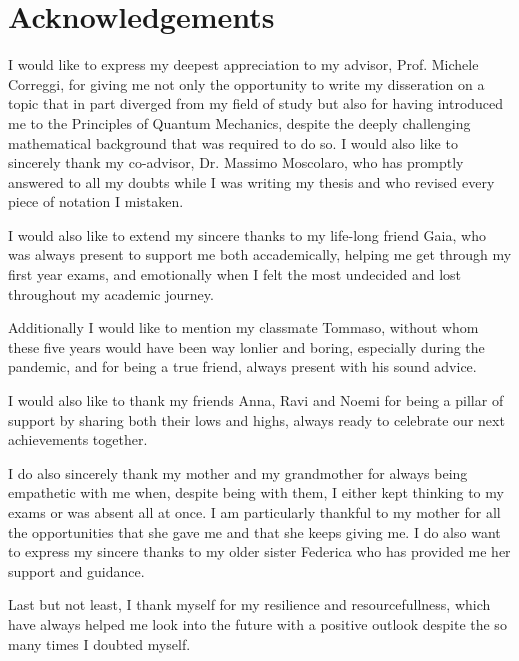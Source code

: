 \documentclass{Configuration_Files/PoliMi3i_thesis}
\begin{document}
\listoffigures



\chapter*{Acknowledgements}
I would like to express my deepest appreciation to my advisor, Prof. 
Michele Correggi, for giving me not only the opportunity to write my disseration 
on a topic that in part diverged from my field of study but also for having
introduced me to the Principles of Quantum Mechanics, despite the deeply
challenging mathematical background that was required to do so. 
I would also like to sincerely thank my co-advisor, Dr. Massimo Moscolaro, who
has promptly answered to all my doubts while I was writing my thesis and who
revised every piece of notation I mistaken.

I would also like to extend my sincere thanks to my life-long friend Gaia, who was 
always present to support me both accademically, helping me get through my 
first year exams, and emotionally when I felt the most
undecided and lost throughout my academic journey. 

Additionally I would like to mention my classmate Tommaso, without whom these five 
years would have been way lonlier and boring, especially during the pandemic,
and for being a true friend, always present with his sound advice. 

I would also like to thank my friends Anna, Ravi and Noemi for being a pillar
of support by sharing both their lows and highs, always ready to celebrate our next 
achievements together. 

I do also sincerely thank my mother and my grandmother for always being empathetic with me when, despite being with them, I either kept thinking to my exams or was absent all at once. I am
particularly thankful to my mother for all the opportunities that she gave me and that she keeps
giving me. I do also want to express my sincere thanks to my older sister Federica who has provided me her support and guidance.

Last but not least, I thank myself for my resilience and resourcefullness, which have always helped me look into the future with a positive outlook despite the so many times I doubted myself.

\cleardoublepage
\end{document}
